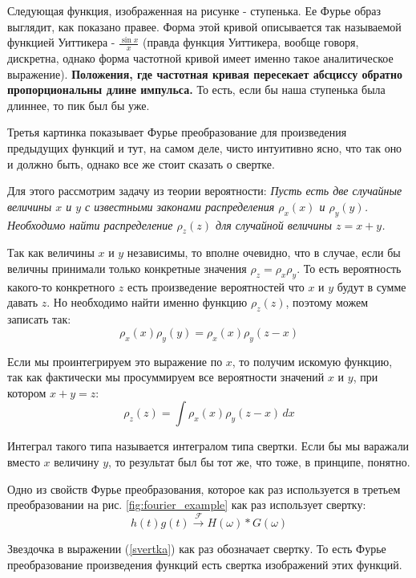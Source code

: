 Следующая функция, изображенная на рисунке - ступенька. Ее Фурье образ выглядит, как показано правее. Форма этой кривой описывается так называемой функцией Уиттикера - $\frac{\sin{x}}{x}$ (правда функция Уиттикера, вообще говоря, дискретна, однако форма частотной кривой имеет именно такое аналитическое выражение). \textbf{Положения, где частотная кривая пересекает абсциссу обратно пропорциональны длине импульса.} То есть, если бы наша ступенька была длиннее, то пик был бы уже.

Третья картинка показывает Фурье преобразование для произведения предыдущих функций и тут, на самом деле, чисто интуитивно ясно, что так оно и должно быть, однако все же стоит сказать о свертке.

Для этого рассмотрим задачу из теории вероятности: \textit{Пусть есть две случайные величины $x$ и $y$ с известными законами распределения $\rho_x(x)$ и $\rho_y(y)$. Необходимо найти распределение $\rho_z(z)$ для случайной величины $z=x+y$.}

Так как величины $x$ и $y$ независимы, то вполне очевидно, что в случае, если бы величны принимали только конкретные значения $\rho_z = \rho_x\rho_y$. То есть вероятность какого-то конкретного $z$ есть произведение вероятностей что $x$ и $y$ будут в сумме давать $z$. Но необходимо найти именно функцию $\rho_z(z)$, поэтому можем записать так:
\begin{equation*}
    \rho_x(x)\rho_y(y) = \rho_x(x)\rho_y(z -x)
\end{equation*}

Если мы проинтегрируем это выражение по $x$, то получим искомую функцию, так как фактически мы просуммируем все вероятности значений $x$ и $y$, при котором $x+y=z$:
\begin{equation*}
    \rho_z(z) = \int \rho_x(x)\rho_y(z -x)\, dx 
\end{equation*}

Интеграл такого типа называется интегралом типа свертки. Если бы мы варажали вместо $x$ величину $y$, то результат был бы тот же, что тоже, в принципе, понятно.

Одно из свойств Фурье преобразования, которое как раз используется в третьем преобразовании на рис. \ref{fig:fourier_example} как раз использует свертку:
\begin{equation}
    h(t)g(t) \xrightarrow{\mathscr{F}}H(\omega) * G(\omega)
    \label{svertka}
\end{equation}

Звездочка в выражении (\ref{svertka}) как раз обозначает свертку. То есть Фурье преобразование произведения функций есть свертка изображений этих функций.

